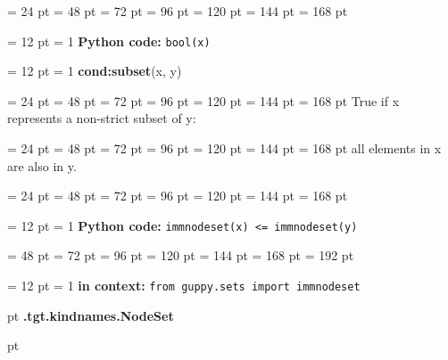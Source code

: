 {{\par \noindent  \leftskip = 24 pt  \leftmargini = 48 pt  \leftmarginii = 72 pt  \leftmarginiii = 96 pt  \leftmarginiv = 120 pt  \leftmarginv = 144 pt  \leftmarginvi = 168 pt {\par \noindent
{\par \pagebreak[3.200000] \noindent \hangindent = 12 pt \hangafter = 1 
{\bf Python code: \/}{\tt bool(x)\/}\par}
\par}
\par}
{\par \pagebreak[3.300000] \noindent \hangindent = 12 pt \hangafter = 1 
{\bf {\large {\bf cond:subset\/}}\/}(x, y)\par}
{\par \noindent  \leftskip = 24 pt  \leftmargini = 48 pt  \leftmarginii = 72 pt  \leftmarginiii = 96 pt  \leftmarginiv = 120 pt  \leftmarginv = 144 pt  \leftmarginvi = 168 pt  True if x represents a non-strict subset of y:\par}
{\par \noindent  \leftskip = 24 pt  \leftmargini = 48 pt  \leftmarginii = 72 pt  \leftmarginiii = 96 pt  \leftmarginiv = 120 pt  \leftmarginv = 144 pt  \leftmarginvi = 168 pt  all elements in x are also in y.\par}
{\par \noindent  \leftskip = 24 pt  \leftmargini = 48 pt  \leftmarginii = 72 pt  \leftmarginiii = 96 pt  \leftmarginiv = 120 pt  \leftmarginv = 144 pt  \leftmarginvi = 168 pt {\par \noindent
{\par \pagebreak[3.200000] \noindent \hangindent = 12 pt \hangafter = 1 
{\bf Python code: \/}{\tt immnodeset(x) {\textless}= immnodeset(y)\/}\par}
{\par \noindent  \leftskip = 48 pt  \leftmargini = 72 pt  \leftmarginii = 96 pt  \leftmarginiii = 120 pt  \leftmarginiv = 144 pt  \leftmarginv = 168 pt  \leftmarginvi = 192 pt {\par \noindent
{\par \pagebreak[3.100000] \noindent \hangindent = 12 pt \hangafter = 1 
{\bf in context: \/}{\tt from guppy.sets import immnodeset\/}\par}
\par}
\par}
\par}
\par}
\par}
{\par \pagebreak[3]  pt \noindent
{\LARGE {\bf .tgt.kindnames.NodeSet\/}}\par {} pt
} \noindent

